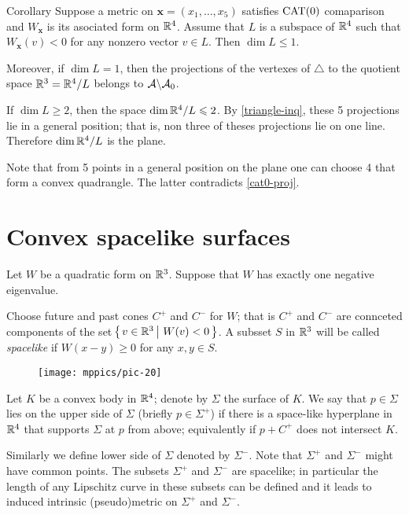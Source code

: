 \documentclass{article}
\begin{document}
\begin{thm}{Corollary}\label{cor:3+2}
Suppose a metric on $\bm{x}=(x_1,\dots,x_5)$ satisfies $\mathrm{CAT}(0)$ comaparison
and $W_{\bm{x}}$ is its asociated form on $\mathbb{R}^{4}$.
Assume that $L$ is a subspace of $\mathbb{R}^{4}$ such that
$W_{\bm{x}}(v)< 0$ for any nonzero vector $v\in L$.
Then $\dim L\le 1$.

Moreover, if $\dim L= 1$, then the projections of the vertexes of $\triangle$ to the quotient space $\mathbb{R}^3=\mathbb{R}^4/L$ belongs to $\mathcal{A}\backslash\mathcal{A}_0$. 
\end{thm}

If $\dim L\ge 2$, then the space $\mathop{\rm dim}\nolimits \mathbb{R}^4/L\leqslant 2$.
By \ref{triangle-inq}, these 5 projections lie in a general position; that is, non three of theses projections lie on one line. 
Therefore $\mathop{\rm dim}\nolimits \mathbb{R}^4/L$ is the plane.

Note that from 5 points in a general position on the plane one can choose 4 that form a convex quadrangle.
The latter contradicts \ref{cat0-proj}.
\qeds

\section{Convex spacelike surfaces}

Let $W$ be a quadratic form on $\mathbb{R}^3$.
Suppose that  $W$ has exactly one negative eigenvalue.

Choose future and past cones $C^+$ and $C^-$ for $W$;
that is $C^+$ and $C^-$ are connceted components of the set
$\set{v\in\RR^3}{W(v)< 0}$.
A subsset $S$ in $\mathbb{R}^3$ will be called \emph{spacelike} if $W(x-y)\ge 0$ for any $x,y\in S$.

\begin{wrapfigure}{r}{53mm}
\vskip-4mm
\centering
\texttt{[image: mppics/pic-20]}
\end{wrapfigure}

Let $K$ be a convex body in $\mathbb{R}^4$;
denote by $\Sigma$ the surface of $K$. 
We say that $p\in \Sigma$ lies on the upper side of $\Sigma$ (briefly $p\in\Sigma^+$) if there is a space-like hyperplane in $\mathbb{R}^4$ that supports $\Sigma$ at $p$ from above;
equivalently if $p+C^+$ does not intersect $K$.

Similarly we define lower side of $\Sigma$ denoted by $\Sigma^-$.
Note that $\Sigma^+$ and $\Sigma^-$ might have common points.
The subsets $\Sigma^+$ and $\Sigma^-$ are spacelike;
in particular the length of any Lipschitz curve in these subsets can be defined and it leads to induced intrinsic (pseudo)metric on $\Sigma^+$ and $\Sigma^-$. 
\end{document}
